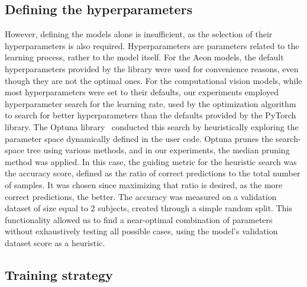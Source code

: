 \documentclass[final,3p,times,twocolumn]{elsarticle}
\begin{document}
\subsection{Defining the hyperparameters}

However, defining the models alone is insufficient, as the selection of their hyperparameters is also required. Hyperparameters are parameters related to the learning process, rather to the model itself. For the Aeon models, the default hyperparameters provided by the library were used for convenience reasons, even though they are not the optimal ones. For the computational vision models, while most hyperparameters were set to their defaults, our experiments employed hyperparameter search for the learning rate, used by the optimization algorithm to search for better hyperparameters than the defaults provided by the PyTorch library. The Optuna library~\cite{optuna} conducted this search by heuristically exploring the parameter space dynamically defined in the user code. Optuna prunes the search-space tree using various methods, and in our experiments, the median pruning method was applied. In this case, the guiding metric for the heuristic search was the accuracy score, defined as the ratio of correct predictions to the total number of samples. It was chosen since maximizing that ratio is desired, as the more correct predictions, the better. The accuracy was measured on a validation dataset of size equal to 2 subjects, created through a simple random split. This functionality allowed us to find a near-optimal combination of parameters without exhaustively testing all possible cases, using the model's validation dataset score as a heuristic.

\subsection{Training strategy}
\end{document}
